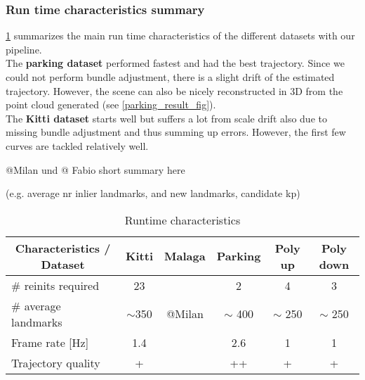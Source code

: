 \subsubsection{Run time characteristics summary}
\cref{runtime_table} summarizes the main run time characteristics of the different datasets with our pipeline.\\

The \textbf{parking dataset} performed fastest and had the best trajectory. Since we could not perform bundle adjustment, there is a slight drift of the estimated trajectory. However, the scene can also be nicely reconstructed in 3D from the point cloud generated (see \cref{parking_result_fig}).\\

The \textbf{Kitti dataset} starts well but suffers a lot from scale drift also due to missing bundle adjustment and thus summing up errors. However, the first few curves are tackled relatively well.


\textcolor[rgb]{0,0,0}{\colorbox[rgb]{1,0,0}{@Milan und @ Fabio short summary here}}

(e.g. average nr inlier landmarks, and new landmarks, candidate kp)
\begin{table}[h!!]
	\centering
	\begin{tabular}{|l|c|c|c|c|c|}
	\hline
	\multicolumn{1}{|c|}{\textbf{Characteristics / Dataset}} & \textbf{Kitti} & \textbf{Malaga} & \textbf{Parking} & \textbf{Poly up} & \textbf{Poly down} \\ \hline
	\# reinits required                                      & 23             &                 & 2                & 4 & 3  \\ \hline
	\# average landmarks                                     & $\sim$350      &  @Milan         & $\sim$ 400       & $\sim$ 250 & $\sim$ 250 \\ \hline
	Frame rate {[}Hz{]}                                      & 1.4            &                 & 2.6              & 1 & 1 \\ \hline
	Trajectory quality                                       & +              &                 & ++               & + & + \\ \hline
	\end{tabular}
	\caption{Runtime characteristics}
	\label{runtime_table}
\end{table}

